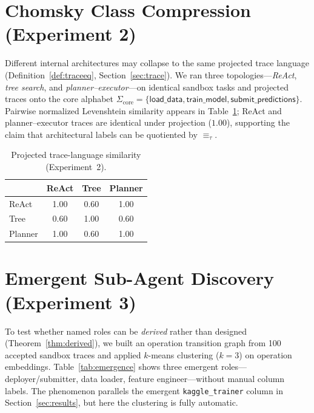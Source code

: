 
\section{Chomsky Class Compression (Experiment 2)}

Different internal architectures may collapse to the same projected
trace language (Definition~\ref{def:traceeq}, Section~\ref{sec:trace}).
We ran three topologies---\emph{ReAct}, \emph{tree search}, and
\emph{planner--executor}---on identical sandbox tasks and projected
traces onto the core alphabet
$\Sigma_{\mathrm{core}}=\{\textsf{load\_data},
\textsf{train\_model}, \textsf{submit\_predictions}\}$.
Pairwise normalized Levenshtein similarity appears in
Table~\ref{tab:compression}; ReAct and planner--executor traces are
identical under projection ($1.00$), supporting the claim that
architectural labels can be quotiented by $\equiv_\tau$.

\begin{table}[ht]
\centering
\caption{Projected trace-language similarity (Experiment~2).}
\label{tab:compression}
\begin{tabular}{lccc}
\hline
 & \textbf{ReAct} & \textbf{Tree} & \textbf{Planner} \\ \hline
ReAct    & 1.00 & 0.60 & 1.00 \\
Tree     & 0.60 & 1.00 & 0.60 \\
Planner  & 1.00 & 0.60 & 1.00 \\
\hline
\end{tabular}
\end{table}

\section{Emergent Sub-Agent Discovery (Experiment 3)}

To test whether named roles can be \emph{derived} rather than designed
(Theorem~\ref{thm:derived}), we built an operation transition graph from
100 accepted sandbox traces and applied $k$-means clustering ($k{=}3$) on
operation embeddings.  Table~\ref{tab:emergence} shows three emergent
roles---deployer/submitter, data loader, feature engineer---without
manual column labels.  The phenomenon parallels the emergent
\texttt{kaggle\_trainer} column in Section~\ref{sec:results}, but here
the clustering is fully automatic.

